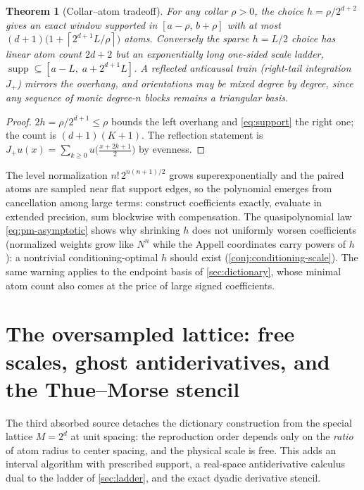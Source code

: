 \documentclass[11pt,oneside]{article}
\numberwithin{equation}{section}
\newtheorem{theorem}{Theorem}[section]
\theoremstyle{definition}
\theoremstyle{remark}
\newcommand{\ceil}[1]{\left\lceil #1\right\rceil}
\newcommand{\supp}{\operatorname{supp}}
\begin{document}
\begin{theorem}[Collar--atom tradeoff]
\label{thm:collar}
For any collar $\rho>0$, the choice $h=\rho/2^{d+2}$ gives an exact
window supported in $[a-\rho,\,b+\rho]$ with at most
$(d+1)\bigl(1+\ceil{2^{d+1}L/\rho}\bigr)$ atoms.  Conversely the
sparse $h=L/2$ choice has linear atom count $2d+2$ but an
exponentially long one-sided scale ladder,
$\supp\subseteq[a-L,\;a+2^{d+1}L]$.  A reflected anticausal train
(right-tail integration $J_+$) mirrors the overhang, and orientations
may be mixed degree by degree, since any sequence of monic
degree-$n$ blocks remains a triangular basis.
\end{theorem}

\begin{proof}
$2h=\rho/2^{d+1}\le\rho$ bounds the left overhang and
\eqref{eq:support} the right one; the count is
$(d+1)(K+1)$.  The reflection statement is
$J_+u(x)=\sum_{k\ge0}u\bigl(\tfrac{x+2k+1}2\bigr)$ by evenness.
\end{proof}

\begin{remark}[Conditioning]
The level normalization $n!\,2^{n(n+1)/2}$ grows superexponentially
and the paired atoms are sampled near flat support edges, so the
polynomial emerges from cancellation among large terms: construct
coefficients exactly, evaluate in extended precision, sum blockwise
with compensation.  The quasipolynomial law
\eqref{eq:pm-asymptotic} shows why shrinking $h$ does not uniformly
worsen coefficients (normalized weights grow like $N^{n}$ while the
Appell coordinates carry powers of $h$): a nontrivial
conditioning-optimal $h$ should exist
(\cref{conj:conditioning-scale}).  The same warning applies to the
endpoint basis of \cref{sec:dictionary}, whose minimal atom count
also comes at the price of large signed coefficients.
\end{remark}


\section{The oversampled lattice: free scales, ghost antiderivatives,
and the Thue--Morse stencil}
\label{sec:lattice}

The third absorbed source detaches the dictionary construction from
the special lattice $M=2^{d}$ at unit spacing: the reproduction order
depends only on the \emph{ratio} of atom radius to center spacing,
and the physical scale is free.  This adds an interval algorithm with
prescribed support, a real-space antiderivative calculus dual to the
ladder of \cref{sec:ladder}, and the exact dyadic derivative stencil.
\end{document}
